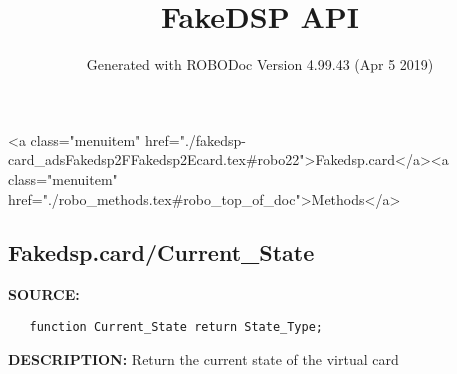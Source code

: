 \documentclass{article}
\title{FakeDSP API}
\author{Generated with ROBODoc Version 4.99.43 (Apr  5 2019)
}
\begin{document}
\maketitle
\printindex
\tableofcontents
\newpage

<a class="menuitem" href="./fakedsp-card_adsFakedsp2FFakedsp2Ecard.tex#robo22">Fakedsp.card</a><a class="menuitem" href="./robo_methods.tex#robo_top_of_doc">Methods</a>\subsection{Fakedsp.card/Current\_State}
\textbf{SOURCE:}\hspace{0.08in}\begin{verbatim}
   function Current_State return State_Type;
\end{verbatim}
\textbf{DESCRIPTION:}\hspace{0.08in}
  Return the current state of the virtual card
\end{document}
